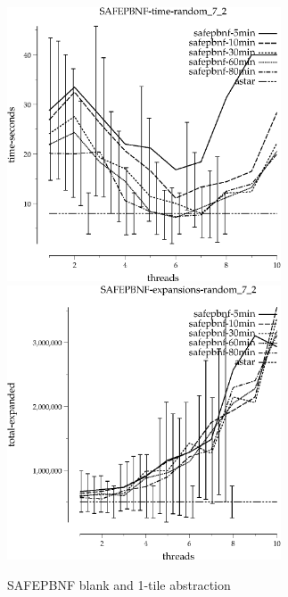 \documentclass{article}
\begin{document}
\begin{figure}
\begin{center}
\includegraphics[width=3.2in]{tiles_random_7_2/SAFEPBNF-time-random_7_2}
\includegraphics[width=3.2in]{tiles_random_7_2/SAFEPBNF-expansions-random_7_2}
\end{center}
\caption{SAFEPBNF blank and 1-tile abstraction}
\end{figure}
\end{document}
